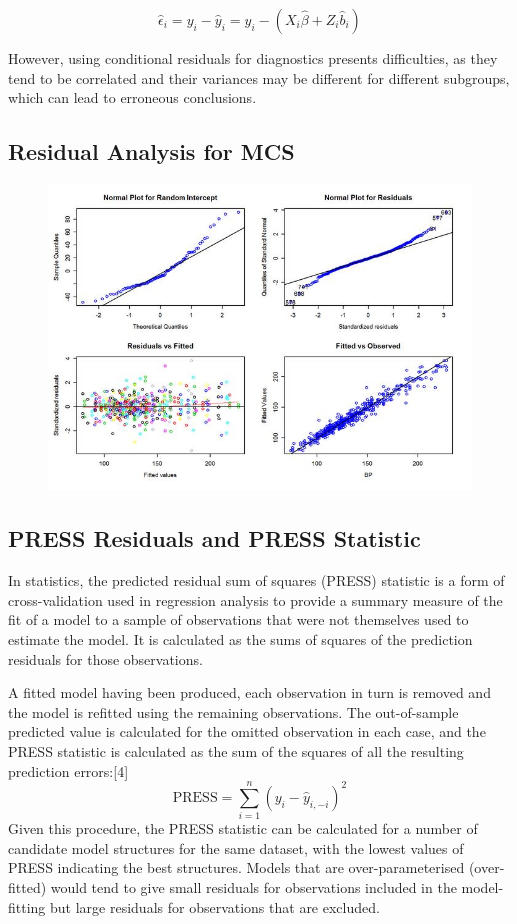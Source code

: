 \[ \hat{\epsilon}_{i} = y_{i} - \hat{y}_{i} = y_{i} - ( X_{i}\hat{\beta} + Z_{i}\hat{b}_{i}) \]

However, using conditional residuals for diagnostics presents difficulties, as they tend to be correlated and their variances may be different for different subgroups, which can lead to erroneous conclusions.


\newpage
\subsection{Residual Analysis for MCS}

\begin{figure}[h!]
	\centering
	\includegraphics[width=0.9\linewidth]{images/ResidPlot}
	\caption{}
	\label{fig:ResidPlot}
\end{figure}


\subsection{PRESS Residuals and PRESS Statistic}
In statistics, the predicted residual sum of squares (PRESS) statistic is a form of cross-validation used in regression analysis to provide a summary measure of the fit of a model to a sample of observations that were not themselves used to estimate the model. It is calculated as the sums of squares of the prediction residuals for those observations.

A fitted model having been produced, each observation in turn is removed and the model is refitted using the remaining observations. The out-of-sample predicted value is calculated for the omitted observation in each case, and the PRESS statistic is calculated as the sum of the squares of all the resulting prediction errors:[4]
\[\mbox{PRESS} =\sum_{i=1}^n (y_i - \hat{y}_{i, -i})^2 \]
Given this procedure, the PRESS statistic can be calculated for a number of candidate model structures for the same dataset, with the lowest values of PRESS indicating the best structures. Models that are over-parameterised (over-fitted) would tend to give small residuals for observations included in the model-fitting but large residuals for observations that are excluded.

